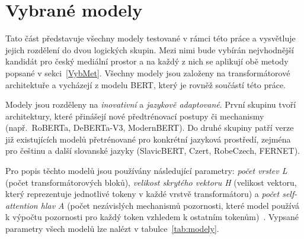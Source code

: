 \section{Vybrané modely}\label{Modely}
Tato část představuje všechny modely testované v rámci této práce a vysvětluje jejich rozdělení do dvou logických skupin. Mezi nimi bude vybírán nejvhodnější kandidát pro český mediální prostor a na každý z nich se aplikují obě metody popsané v sekci~\ref{VybMet}. Všechny modely jsou založeny na transformátorové architektuře a vycházejí z modelu BERT, který je rovněž součástí této práce.

Modely jsou rozděleny na \emph{inovativní} a \emph{jazykově adaptované}. První skupinu tvoří architektury, které přinášejí nové předtrénovací postupy či mechanismy (např.\ RoBERTa, DeBERTa-V3, ModernBERT). Do druhé skupiny patří verze již existujících modelů přetrénované pro konkrétní jazyková prostředí, zejména pro češtinu a další slovanské jazyky (SlavicBERT, Czert, RobeCzech, FERNET).

Pro popis těchto modelů jsou používány následující parametry: \emph{počet vrstev L} (počet transformátorových bloků), \emph{velikost skrytého vektoru H} (velikost vektoru, který reprezentuje jednotlivé tokeny v každé vrstvě transformátoru) a \emph{počet self-attention hlav A} (počet nezávislých mechanismů pozornosti, které model používá k výpočtu pozornosti pro každý token vzhledem k ostatním tokenům)~\cite{devlin2019bert}. Vypsané parametry všech modelů lze nalézt v tabulce~\ref{tab:modely}.

